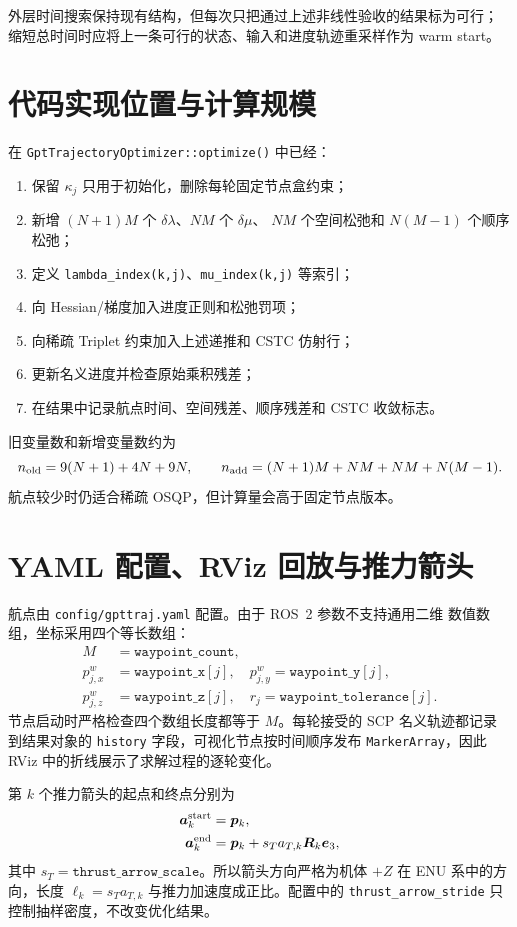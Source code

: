 \documentclass[UTF8,a4paper,11pt]{ctexart}
\begin{document}
外层时间搜索保持现有结构，但每次只把通过上述非线性验收的结果标为可行；
缩短总时间时应将上一条可行的状态、输入和进度轨迹重采样作为 warm start。

\section{代码实现位置与计算规模}

在 \texttt{GptTrajectoryOptimizer::optimize()} 中已经：
\begin{enumerate}
 \item 保留 $\kappa_j$ 只用于初始化，删除每轮固定节点盒约束；
 \item 新增 $(N+1)M$ 个 $\delta\lambda$、$NM$ 个 $\delta\mu$、
 $NM$ 个空间松弛和 $N(M-1)$ 个顺序松弛；
 \item 定义 \texttt{lambda\_index(k,j)}、\texttt{mu\_index(k,j)} 等索引；
 \item 向 Hessian/梯度加入进度正则和松弛罚项；
 \item 向稀疏 Triplet 约束加入上述递推和 CSTC 仿射行；
 \item 更新名义进度并检查原始乘积残差；
 \item 在结果中记录航点时间、空间残差、顺序残差和 CSTC 收敛标志。
\end{enumerate}
旧变量数和新增变量数约为
\[
 n_{\rm old}=9(N+1)+4N+9N,\qquad
 n_{\rm add}=(N+1)M+NM+NM+N(M-1).
\]
航点较少时仍适合稀疏 OSQP，但计算量会高于固定节点版本。

\section{YAML 配置、RViz 回放与推力箭头}

航点由 \texttt{config/gpttraj.yaml} 配置。由于 ROS~2 参数不支持通用二维
数值数组，坐标采用四个等长数组：
\begin{align}
 M&=\texttt{waypoint\_count},\\
 p_{j,x}^w&=\texttt{waypoint\_x}[j],\quad
 p_{j,y}^w=\texttt{waypoint\_y}[j],\\
 p_{j,z}^w&=\texttt{waypoint\_z}[j],\quad
 r_j=\texttt{waypoint\_tolerance}[j].
\end{align}
节点启动时严格检查四个数组长度都等于 $M$。每轮接受的 SCP 名义轨迹都记录
到结果对象的 \texttt{history} 字段，可视化节点按时间顺序发布
\texttt{MarkerArray}，因此 RViz 中的折线展示了求解过程的逐轮变化。

第 $k$ 个推力箭头的起点和终点分别为
\begin{align}
 \bm a_k^{\rm start}&=\bm p_k,\\
 \bm a_k^{\rm end}&=\bm p_k+s_T a_{T,k}\bm R_k\bm e_3,
\end{align}
其中 $s_T=\texttt{thrust\_arrow\_scale}$。所以箭头方向严格为机体 $+Z$
在 ENU 系中的方向，长度 $\ell_k=s_Ta_{T,k}$ 与推力加速度成正比。配置中的
\texttt{thrust\_arrow\_stride} 只控制抽样密度，不改变优化结果。
\end{document}
